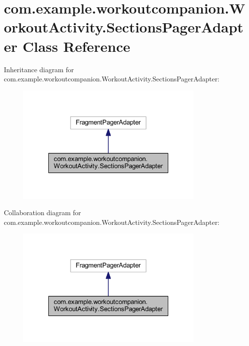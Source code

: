 \hypertarget{classcom_1_1example_1_1workoutcompanion_1_1_workout_activity_1_1_sections_pager_adapter}{\section{com.\-example.\-workoutcompanion.\-Workout\-Activity.\-Sections\-Pager\-Adapter Class Reference}
\label{classcom_1_1example_1_1workoutcompanion_1_1_workout_activity_1_1_sections_pager_adapter}
}


Inheritance diagram for com.\-example.\-workoutcompanion.\-Workout\-Activity.\-Sections\-Pager\-Adapter\-:
\nopagebreak
\begin{figure}[H]
\begin{center}
\leavevmode
\includegraphics[width=264pt]{classcom_1_1example_1_1workoutcompanion_1_1_workout_activity_1_1_sections_pager_adapter__inherit__graph}
\end{center}
\end{figure}


Collaboration diagram for com.\-example.\-workoutcompanion.\-Workout\-Activity.\-Sections\-Pager\-Adapter\-:
\nopagebreak
\begin{figure}[H]
\begin{center}
\leavevmode
\includegraphics[width=264pt]{classcom_1_1example_1_1workoutcompanion_1_1_workout_activity_1_1_sections_pager_adapter__coll__graph}
\end{center}
\end{figure}
